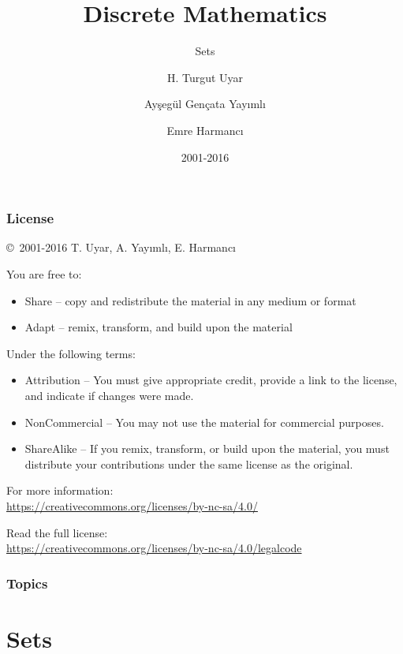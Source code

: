 \documentclass[dvipsnames]{beamer}
\title{Discrete Mathematics}
\subtitle{Sets}
\author{H. Turgut Uyar \and Ayşegül Gençata Yayımlı \and Emre Harmancı}
\date{2001-2016}
\begin{document}
\begin{frame}
  \titlepage
\end{frame}

\begin{frame}
  \frametitle{License}

  \hfill
  \copyright~2001-2016 T. Uyar, A. Yayımlı, E. Harmancı

  \vfill
  \begin{footnotesize}
    You are free to:
    \begin{itemize}
      \itemsep0em
      \item Share -- copy and redistribute the material in any medium or format
      \item Adapt -- remix, transform, and build upon the material
    \end{itemize}

    Under the following terms:
    \begin{itemize}
      \itemsep0em
      \item Attribution -- You must give appropriate credit, provide a link to
        the license, and indicate if changes were made.

      \item NonCommercial -- You may not use the material for commercial
        purposes.

      \item ShareAlike -- If you remix, transform, or build upon the material,
        you must distribute your contributions under the same license as the
        original.
    \end{itemize}
  \end{footnotesize}

  \begin{small}
    For more information:\\
    \url{https://creativecommons.org/licenses/by-nc-sa/4.0/}

    \smallskip
    Read the full license:\\
    \url{https://creativecommons.org/licenses/by-nc-sa/4.0/legalcode}
  \end{small}
\end{frame}

\begin{frame}
  \frametitle{Topics}
  \tableofcontents
\end{frame}

\section{Sets}
\end{document}
